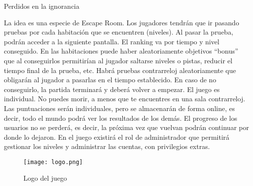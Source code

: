 \documentclass[a4paper]{article}
\begin{document}
Perdidos en la ignorancia 

La idea es una especie de Escape Room. Los jugadores tendrán que ir pasando pruebas por cada habitación que se encuentren (niveles). Al pasar la prueba, podrán acceder a la siguiente pantalla. 
El ranking va por tiempo y nivel conseguido. En las habitaciones puede haber aleatoriamente objetivos “bonus” que al conseguirlos permitirían al jugador saltarse niveles o pistas, reducir el tiempo final de la prueba, etc.
Habrá pruebas contrarreloj aleatoriamente que obligarán al jugador a pasarlas en el tiempo establecido. En caso de no conseguirlo, la partida terminará y deberá volver a empezar.
El juego es individual. No puedes morir, a menos que te encuentres en una sala contrarreloj. Las puntuaciones serán individuales, pero se almacenarán de forma online, es decir, todo el mundo podrá ver los resultados de los demás.  El progreso de los usuarios no se perderá, es decir, la próxima vez que vuelvan podrán continuar por donde lo dejaron. En el juego existirá el rol de administrador que permitirá gestionar los niveles y administrar las cuentas, con privilegios extras.

\begin{figure}[th]
  \centering
\texttt{[image: logo.png]}
   \caption{Logo del juego}
  \label{fig:gamelogo}
  \end{figure}
  
\end{document}
